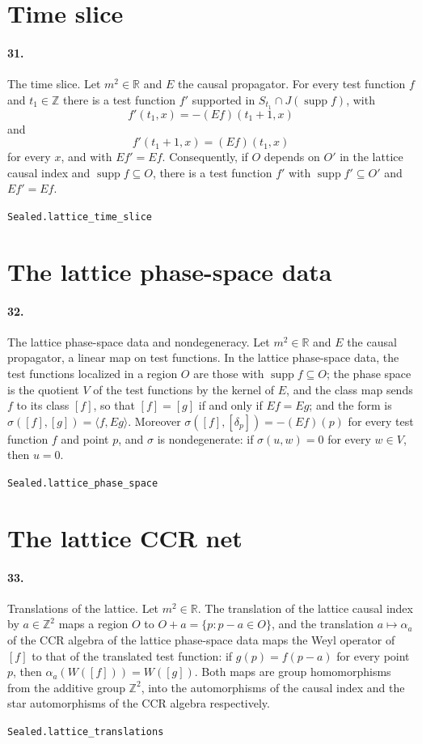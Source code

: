 \documentclass[11pt]{article}
\begin{document}
\section*{Time slice}
\paragraph{31.} The time slice. Let $m^2 \in \mathbb R$ and $E$ the causal propagator. For every test function $f$ and $t_1 \in \mathbb Z$ there is a test function $f'$ supported in $S_{t_1} \cap J(\operatorname{supp} f)$, with \[f'(t_1, x) = -(E f)(t_1 + 1, x)\] and \[f'(t_1 + 1, x) = (E f)(t_1, x)\] for every $x$, and with $E f' = E f$. Consequently, if $O$ depends on $O'$ in the lattice causal index and $\operatorname{supp} f \subseteq O$, there is a test function $f'$ with $\operatorname{supp} f' \subseteq O'$ and $E f' = E f$.\par{\footnotesize\texttt{Sealed.lattice\_time\_slice}}

\section*{The lattice phase-space data}
\paragraph{32.} The lattice phase-space data and nondegeneracy. Let $m^2 \in \mathbb R$ and $E$ the causal propagator, a linear map on test functions. In the lattice phase-space data, the test functions localized in a region $O$ are those with $\operatorname{supp} f \subseteq O$; the phase space is the quotient $V$ of the test functions by the kernel of $E$, and the class map sends $f$ to its class $[f]$, so that $[f] = [g]$ if and only if $E f = E g$; and the form is $\sigma([f], [g]) = \langle f, E g \rangle$. Moreover $\sigma([f], [\delta_p]) = -(E f)(p)$ for every test function $f$ and point $p$, and $\sigma$ is nondegenerate: if $\sigma(u, w) = 0$ for every $w \in V$, then $u = 0$.\par{\footnotesize\texttt{Sealed.lattice\_phase\_space}}

\section*{The lattice CCR net}
\paragraph{33.} Translations of the lattice. Let $m^2 \in \mathbb R$. The translation of the lattice causal index by $a \in \mathbb Z^2$ maps a region $O$ to $O + a = \{p : p - a \in O\}$, and the translation $a \mapsto \alpha_a$ of the CCR algebra of the lattice phase-space data maps the Weyl operator of $[f]$ to that of the translated test function: if $g(p) = f(p - a)$ for every point $p$, then $\alpha_a(W([f])) = W([g])$. Both maps are group homomorphisms from the additive group $\mathbb Z^2$, into the automorphisms of the causal index and the star automorphisms of the CCR algebra respectively.\par{\footnotesize\texttt{Sealed.lattice\_translations}}
\end{document}
